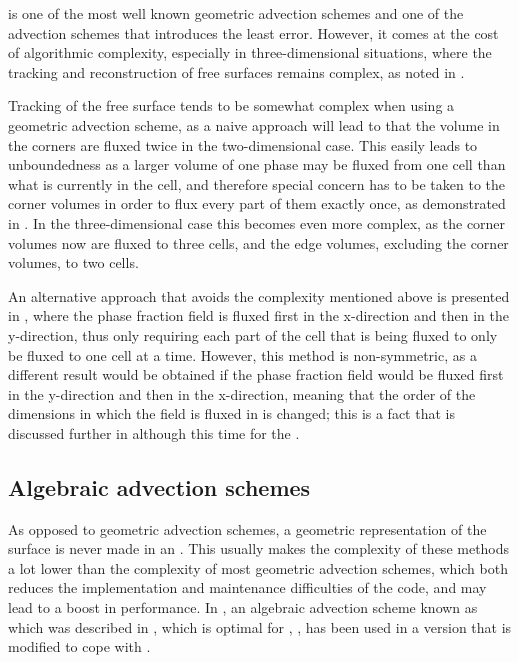 \PLIC is one of the most well known geometric advection schemes and one of the advection schemes that introduces the least error. However, it comes at the cost of algorithmic complexity, especially in three-dimensional situations, where the tracking and reconstruction of free surfaces remains complex, as noted in \citep{Ingram2009}.

Tracking of the free surface tends to be somewhat complex when using a geometric advection scheme, as a naive approach will lead to that the volume in the corners are fluxed twice in the two-dimensional case. This easily leads to unboundedness as a larger volume of one phase may be fluxed from one cell than what is currently in the cell, and therefore special concern has to be taken to the corner volumes in order to flux every part of them exactly once, as demonstrated in \citep{Rider1998}. In the three-dimensional case this becomes even more complex, as the corner volumes now are fluxed to three cells, and the edge volumes, excluding the corner volumes, to two cells.

An alternative approach that avoids the complexity mentioned above is presented in \citep{Aulisa2003}, where the phase fraction field is fluxed first in the x-direction and then in the y-direction, thus only requiring each part of the cell that is being fluxed to only be fluxed to one cell at a time. However, this method is non-symmetric, as a different result would be obtained if the phase fraction field would be fluxed first in the y-direction and then in the x-direction, meaning that the order of the dimensions in which the field is fluxed in is changed; this is a fact that is discussed further in \citep{Ubbink1999} although this time for the  .

\subsection{Algebraic advection schemes}

As opposed to geometric advection schemes, a geometric representation of the surface is never made in an . This usually makes the complexity of these methods a lot lower than the complexity of most geometric advection schemes, which both reduces the implementation and maintenance difficulties of the code, and may lead to a boost in performance. In \thisprojectwork, an algebraic advection scheme known as  which was described in \citep{Leonard1988}, which is optimal for , , has been used in a version that is modified to cope with .

